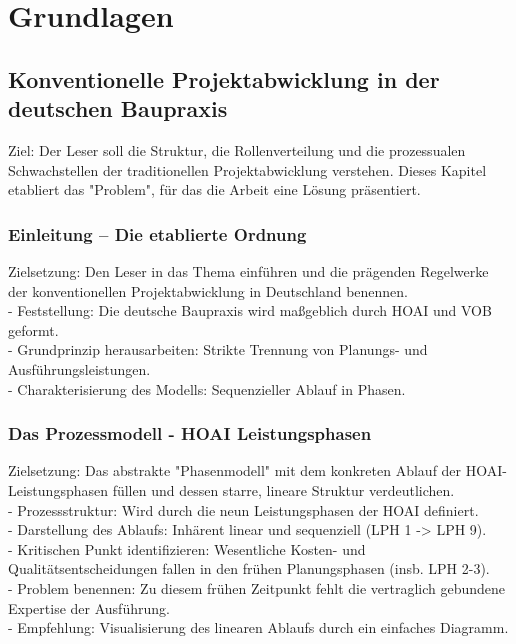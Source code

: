\chapter{Grundlagen}
\label{ch:grundlagen}


\section{Konventionelle Projektabwicklung in der deutschen Baupraxis}
\label{sec: 2.1}
Ziel: Der Leser soll die Struktur, die Rollenverteilung und die prozessualen Schwachstellen der traditionellen Projektabwicklung verstehen. Dieses Kapitel etabliert das "Problem", für das die Arbeit eine Lösung präsentiert.

\subsection{Einleitung -- Die etablierte Ordnung}
\label{sec: 2.1.1}
Zielsetzung: Den Leser in das Thema einführen und die prägenden Regelwerke der konventionellen Projektabwicklung in Deutschland benennen.\\
- Feststellung: Die deutsche Baupraxis wird maßgeblich durch HOAI und VOB geformt.\\
- Grundprinzip herausarbeiten: Strikte Trennung von Planungs- und Ausführungsleistungen.\\
- Charakterisierung des Modells: Sequenzieller Ablauf in Phasen.\\



\subsection{Das Prozessmodell - HOAI Leistungsphasen}
\label{sec: 2.1.2}
Zielsetzung: Das abstrakte "Phasenmodell" mit dem konkreten Ablauf der HOAI-Leistungsphasen füllen und dessen starre, lineare Struktur verdeutlichen.\\
- Prozessstruktur: Wird durch die neun Leistungsphasen der HOAI definiert.\\
- Darstellung des Ablaufs: Inhärent linear und sequenziell (LPH 1 -> LPH 9).\\
- Kritischen Punkt identifizieren: Wesentliche Kosten- und Qualitätsentscheidungen fallen in den frühen Planungsphasen (insb. LPH 2-3).\\
- Problem benennen: Zu diesem frühen Zeitpunkt fehlt die vertraglich gebundene Expertise der Ausführung.\\
- Empfehlung: Visualisierung des linearen Ablaufs durch ein einfaches Diagramm.\\

